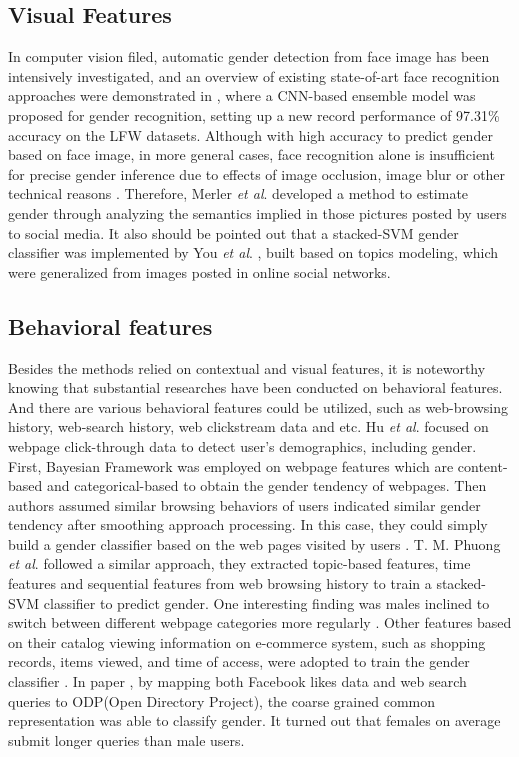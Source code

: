 \documentclass[runningheads]{llncs}
\begin{document}
	\subsection{Visual Features}
	
	In computer vision filed, automatic gender detection from face image has been intensively investigated, and an overview of existing state-of-art face recognition approaches were demonstrated in \cite{antipov2016minimalistic}, where a CNN-based ensemble model was proposed for gender recognition, setting up a new record performance of 97.31\% accuracy on the LFW datasets. Although with high accuracy to predict gender based on face image, in more general cases, face recognition alone is insufficient for precise gender inference due to effects of image occlusion, image blur or other technical reasons \cite{merler2015you}. Therefore, Merler \textit{et al}. developed a method to estimate gender through analyzing the semantics implied in those pictures posted by users to social media. It also should be pointed out that a stacked-SVM gender classifier was implemented by You \textit{et al}. \cite{you2014eyes}, built based on topics modeling, which were generalized from images posted in online social networks. 
	 
	\subsection{Behavioral features}
	
	Besides the methods relied on contextual and visual features, it is noteworthy knowing that substantial researches have been conducted on behavioral features. And there are various behavioral features could be utilized, such as web-browsing history, web-search history, web clickstream data and etc. Hu \textit{et al}. focused on webpage click-through data to detect user’s demographics, including gender. First, Bayesian Framework was employed on webpage features which are content-based and categorical-based to obtain the gender tendency of webpages. Then authors assumed similar browsing behaviors of users indicated similar gender tendency after smoothing approach processing. In this case, they could simply build a gender classifier based on the web pages visited by users \cite{hu2007demographic}. T. M. Phuong \textit{et al}. followed a similar approach, they extracted topic-based features, time features and sequential features from web browsing history to train a stacked-SVM classifier to predict gender. One interesting finding was males inclined to switch between different webpage categories more regularly \cite{phuong2014gender}. Other features based on their catalog viewing information on e-commerce system, such as shopping records, items viewed, and time of access, were adopted to train the gender classifier \cite{duong2016customer}. In paper \cite{bi2013inferring}, by mapping both Facebook likes data and web search queries to ODP(Open Directory Project), the coarse grained common representation was able to classify gender. It turned out that females on average submit longer queries than male users. 
	
\end{document}
